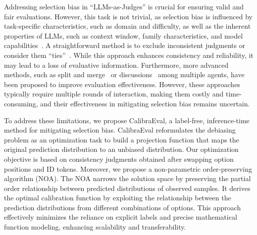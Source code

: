 \documentclass[sigconf]{acmart}
\begin{document}




Addressing selection bias in ``LLMs-as-Judges'' is crucial for ensuring valid and fair evaluations.
However, this task is not trivial, as selection bias is influenced by task-specific characteristics, such as domain and difficulty, as well as the inherent properties of LLMs, such as context window, family characteristics, and model capabilities~\cite{shi2024judging,ye2024justice}.
A straightforward method is to exclude inconsistent judgments or consider them ``ties''~\cite{chen2024humans,zheng2023judging}. While this approach enhances consistency and reliability, it may lead to a loss of evaluative information. Furthermore, more advanced methods, such as split and merge~\cite{li2023split} or discussions~\cite{chan2023chateval,li2023prd} among multiple agents, have been proposed to improve evaluation effectiveness.
However, these approaches typically require multiple rounds of interaction, making them costly and time-consuming, and their effectiveness in mitigating selection bias remains uncertain.


To address these limitations, we propose CalibraEval, a label-free, inference-time method for mitigating selection bias.
CalibraEval reformulates the debiasing problem as an optimization task to build a projection function that maps the original prediction distribution to an unbiased distribution. Our optimization objective is based on consistency judgments obtained after swapping option positions and ID tokens.
 Moreover, we propose a non-parametric order-preserving algorithm (NOA). The NOA narrows the solution space by preserving the partial order relationship between predicted distributions of observed samples. It derives the optimal calibration function by exploiting the relationship between the prediction distributions from different combinations of options. This approach effectively minimizes the reliance on explicit labels and precise mathematical function modeling, enhancing scalability and transferability.
\end{document}
